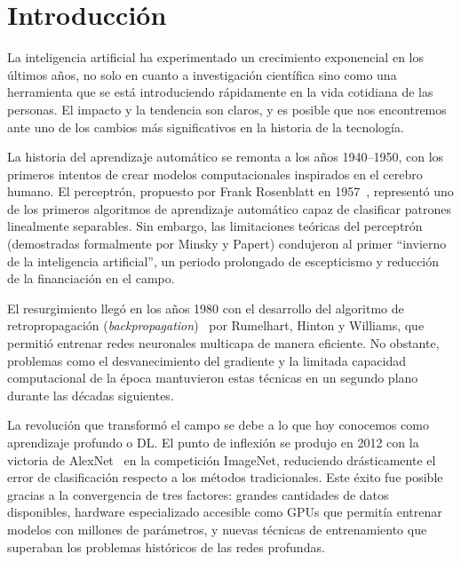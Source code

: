 \chapter{Introducción}\label{ch:intro}

La inteligencia artificial ha experimentado un crecimiento exponencial en los últimos años, no solo en cuanto a investigación científica sino como una herramienta que se está introduciendo rápidamente en la vida cotidiana de las personas. El impacto y la tendencia son claros, y es posible que nos encontremos ante uno de los cambios más significativos en la historia de la tecnología.

La historia del aprendizaje automático se remonta a los años 1940--1950, con los primeros intentos de crear modelos computacionales inspirados en el cerebro humano. El perceptrón, propuesto por Frank Rosenblatt en 1957~\citep{rosenblatt1958perceptron}, representó uno de los primeros algoritmos de aprendizaje automático capaz de clasificar patrones linealmente separables. Sin embargo, las limitaciones teóricas del perceptrón (demostradas formalmente por Minsky y Papert) condujeron al primer ``invierno de la inteligencia artificial'', un periodo prolongado de escepticismo y reducción de la financiación en el campo.

El resurgimiento llegó en los años 1980 con el desarrollo del algoritmo de retropropagación (\textit{backpropagation})~\citep{backpropagation} por Rumelhart, Hinton y Williams, que permitió entrenar redes neuronales multicapa de manera eficiente. No obstante, problemas como el desvanecimiento del gradiente y la limitada capacidad computacional de la época mantuvieron estas técnicas en un segundo plano durante las décadas siguientes.

La revolución que transformó el campo se debe a lo que hoy conocemos como aprendizaje profundo o \gls{DL}. El punto de inflexión se produjo en 2012 con la victoria de AlexNet~\citep{alexnet} en la competición ImageNet, reduciendo drásticamente el error de clasificación respecto a los métodos tradicionales. Este éxito fue posible gracias a la convergencia de tres factores: grandes cantidades de datos disponibles, hardware especializado accesible como \glspl{GPU} que permitía entrenar modelos con millones de parámetros, y nuevas técnicas de entrenamiento que superaban los problemas históricos de las redes profundas.

